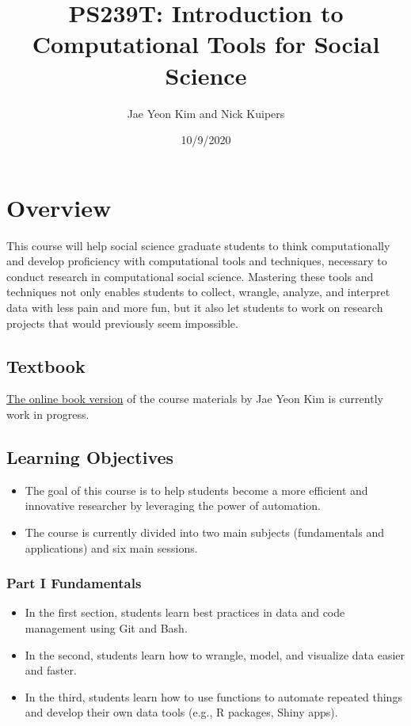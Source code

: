 \documentclass[
]{article}
\title{PS239T: Introduction to Computational Tools for Social Science}
\author{Jae Yeon Kim and Nick Kuipers}
\date{10/9/2020}
\begin{document}
\maketitle

\hypertarget{overview}{%
\section{Overview}\label{overview}}

This course will help social science graduate students to think
computationally and develop proficiency with computational tools and
techniques, necessary to conduct research in computational social
science. Mastering these tools and techniques not only enables students
to collect, wrangle, analyze, and interpret data with less pain and more
fun, but it also let students to work on research projects that would
previously seem impossible.

\hypertarget{textbook}{%
\subsection{Textbook}\label{textbook}}

\href{https://jaeyk.github.io/PS239T/}{The online book version} of the
course materials by Jae Yeon Kim is currently work in progress.

\hypertarget{learning-objectives}{%
\subsection{Learning Objectives}\label{learning-objectives}}

\begin{itemize}
\item
  The goal of this course is to help students become a more efficient
  and innovative researcher by leveraging the power of automation.
\item
  The course is currently divided into two main subjects (fundamentals
  and applications) and six main sessions.
\end{itemize}

\hypertarget{part-i-fundamentals}{%
\subsubsection{Part I Fundamentals}\label{part-i-fundamentals}}

\begin{itemize}
\item
  In the first section, students learn best practices in data and code
  management using Git and Bash.
\item
  In the second, students learn how to wrangle, model, and visualize
  data easier and faster.
\item
  In the third, students learn how to use functions to automate repeated
  things and develop their own data tools (e.g., R packages, Shiny
  apps).
\end{itemize}
\end{document}
